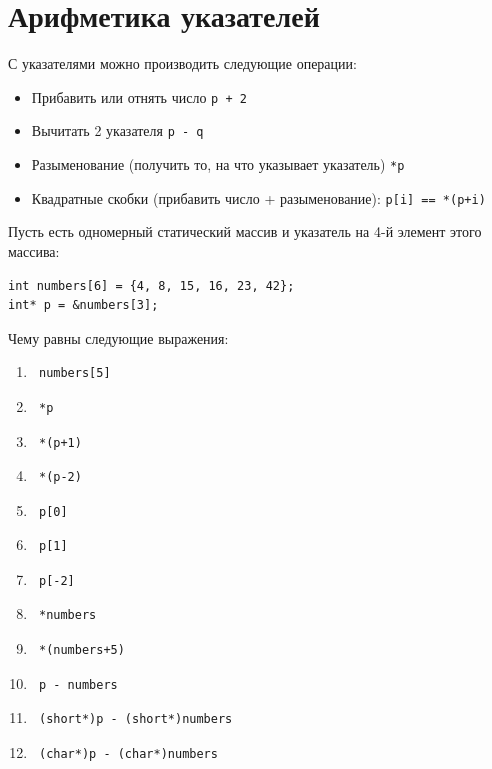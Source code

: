 \documentclass{article}
\begin{document}
\section*{Арифметика указателей}
С указателями можно производить следующие операции:
\begin{itemize}
\item Прибавить или отнять число          \quad             \texttt{p + 2}
\item Вычитать 2 указателя                      \quad       \texttt{p - q}
\item Разыменование (получить то, на что указывает указатель) \quad  \texttt{*p}
\item Квадратные скобки (прибавить число + разыменование): \quad \texttt{p[i] == *(p+i)}
\end{itemize}
Пусть есть одномерный статический массив и указатель на 4-й элемент этого массива:
\begin{lstlisting}
int numbers[6] = {4, 8, 15, 16, 23, 42};
int* p = &numbers[3];
\end{lstlisting}
Чему равны следующие выражения:
\begin{multicols}{3}
\begin{enumerate}
\item \begin{verbatim} numbers[5] \end{verbatim}
\item \begin{verbatim} *p \end{verbatim}
\item \begin{verbatim} *(p+1) \end{verbatim}
\item \begin{verbatim} *(p-2) \end{verbatim}
\item \begin{verbatim} p[0] \end{verbatim}
\item \begin{verbatim} p[1] \end{verbatim}
\item \begin{verbatim} p[-2] \end{verbatim}
\item \begin{verbatim} *numbers \end{verbatim}
\item \begin{verbatim} *(numbers+5) \end{verbatim}
\item \begin{verbatim} p - numbers \end{verbatim}
\item \begin{verbatim} (short*)p - (short*)numbers \end{verbatim}
\item \begin{verbatim} (char*)p - (char*)numbers \end{verbatim}
\end{enumerate}
\end{multicols}
\end{document}
